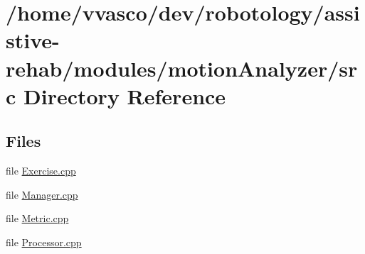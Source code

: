 \section{/home/vvasco/dev/robotology/assistive-\/rehab/modules/motion\+Analyzer/src Directory Reference}
\label{dir_15bec74218e03e1a1fdceb2a93b44656}
\subsection*{Files}
\begin{DoxyCompactItemize}
\item 
file \hyperlink{Exercise_8cpp}{Exercise.\+cpp}
\item 
file \hyperlink{Manager_8cpp}{Manager.\+cpp}
\item 
file \hyperlink{Metric_8cpp}{Metric.\+cpp}
\item 
file \hyperlink{Processor_8cpp}{Processor.\+cpp}
\end{DoxyCompactItemize}
